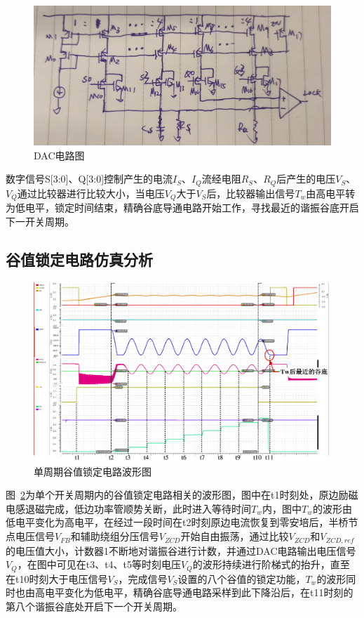 \begin{figure}[htbp] 
    \centering
    \includegraphics[width=0.6\linewidth]{figures/DAC电路.jpg}
    \caption{DAC电路图}
    \label{fig:DAC电路}
\end{figure} 

数字信号S[3:0]、Q[3:0]控制产生的电流$I_S$、$I_Q$流经电阻$R_S$、$R_Q$后产生的电压$V_S$、$V_Q$通过比较器进行比较大小，当电压$V_Q$大于$V_S$后，比较器输出信号$T_w$由高电平转为低电平，锁定时间结束，精确谷底导通电路开始工作，寻找最近的谐振谷底开启下一开关周期。

\subsection{谷值锁定电路仿真分析}

\begin{figure}[htbp] 
    \centering
    \includegraphics[width=0.8\linewidth]{figures/valley_lock.pdf}
    \caption{单周期谷值锁定电路波形图}
    \label{fig:单周期谷值锁定电路波形图}
\end{figure} 

图~\ref{fig:单周期谷值锁定电路波形图}为单个开关周期内的谷值锁定电路相关的波形图，图中在t1时刻处，原边励磁电感退磁完成，低边功率管顺势关断，此时进入等待时间$T_w$内，图中$T_w$的波形由低电平变化为高电平，在经过一段时间在t2时刻原边电流恢复到零安培后，半桥节点电压信号$V_{FB}$和辅助绕组分压信号$V_{ZCD}$开始自由振荡，通过比较$V_{ZCD}$和$V_{ZCD,ref}$的电压值大小，计数器1不断地对谐振谷进行计数，并通过DAC电路输出电压信号$V_{Q}$，在图中可见在t3、t4、t5等时刻电压$V_{Q}$的波形持续进行阶梯式的抬升，直至在t10时刻大于电压信号$V_{S}$，完成信号$V_{S}$设置的八个谷值的锁定功能，$T_w$的波形同时也由高电平变化为低电平，精确谷底导通电路采样到此下降沿后，在t11时刻的第八个谐振谷底处开启下一个开关周期。


